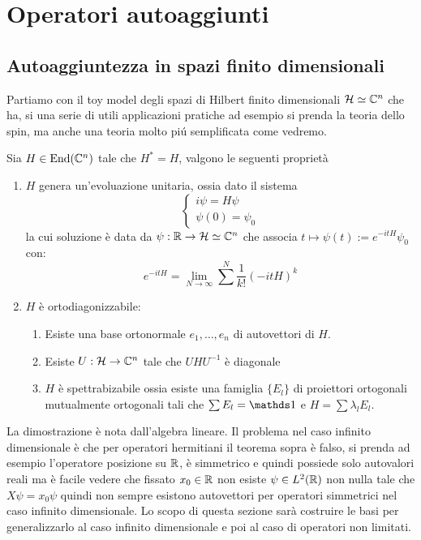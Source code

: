 \chapter{Operatori autoaggiunti}
\section{Autoaggiuntezza in spazi finito dimensionali}

Partiamo con il toy model degli spazi di Hilbert finito dimensionali $\operatorname{\mathcal{H}} \simeq \mathbb{C}^n$ che ha, si una serie di utili applicazioni pratiche ad esempio si prenda la teoria dello spin, ma anche una teoria molto piú semplificata come vedremo.

\begin{theorem}
    Sia $H \in \operatorname{End}(\mathbb{C}^n)$ tale che $H^*= H$, valgono le seguenti proprietà
\begin{enumerate}
    \item $H$ genera un'evoluazione unitaria, ossia dato il sistema 
    \begin{equation*}
        \begin{cases}
            i \psi = H \psi \\
            \psi(0) = \psi_0
        \end{cases}
    \end{equation*}
    la cui soluzione è data da $\psi : \operatorname{\mathbb{R}} \to \operatorname{\mathcal{H}} \simeq \mathbb{C}^n$ che associa $t \mapsto \psi(t):= e^{-itH}\psi_0$ con:
    $$e^{-itH}= \lim_{N \to \infty} \sum^N  \dfrac{1}{k!}(-itH)^k$$
    \item $H$ è ortodiagonizzabile: 
    \begin{enumerate}
        \item Esiste una base ortonormale ${e_1, \dots, e_n}$ di autovettori di $H$.
        \item Esiste $U : \operatorname{\mathcal{H}} \to \mathbb{C}^n$ tale che $U H U^{-1}$ è diagonale
        \item $H$ è spettrabizabile ossia esiste una famiglia $\{E_l\}$ di proiettori ortogonali mutualmente ortogonali tali che $\sum E_l = \un$ e $H = \sum \lambda_l E_l$.
    \end{enumerate}
\end{enumerate}
\end{theorem}
La dimostrazione è nota dall'algebra lineare.
Il problema nel caso infinito dimensionale è che per operatori hermitiani il teorema sopra è falso, si prenda ad esempio l'operatore posizione su $\operatorname{\mathbb{R}}$, è simmetrico e quindi possiede solo autovalori reali ma è facile vedere che fissato $x_0 \in \operatorname{\mathbb{R}}$ non esiste $\psi \in L^2(\operatorname{\mathbb{R}})$ non nulla tale che $X\psi = x_0\psi$ quindi non sempre esistono autovettori per operatori simmetrici nel caso infinito dimensionale.
Lo scopo di questa sezione sarà costruire le basi per generalizzarlo al caso infinito dimensionale e poi al caso di operatori non limitati.


